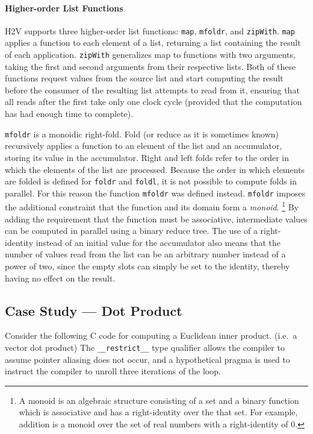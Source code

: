 \documentclass[english,onecolumn]{scrartcl}
\begin{document}
\paragraph{Higher-order List Functions}
\label{sec:listFuncs}
H2V supports three higher-order list functions: \texttt{map}, \texttt{mfoldr}, and \texttt{zipWith}.
\texttt{map} applies a function to each element of a list, returning a list containing the result of each application.
\texttt{zipWith} generalizes map to functions with two arguments, taking the first and second arguments from their respective
lists. Both of these functions request values from the source list and start computing the result before the consumer of the
resulting list attempts to read from it, ensuring that all reads after the first take only one clock cycle (provided that the
computation has had enough time to complete).

\texttt{mfoldr} is a monoidic right-fold. Fold (or reduce as it is sometimes known) recursively applies a function to an element
of the list and an accumulator, storing its value in the accumulator. Right and left folds refer to the order in which the
elements of the list are processed. Because the order in which elements are folded is defined for \texttt{foldr} and
\texttt{foldl}, it is not possible to compute folds in parallel. For this reason the function \texttt{mfoldr} was defined instead.
\texttt{mfoldr} imposes the additional constraint that the function and its domain form a \textit{monoid}.%
\footnote{A monoid is an algebraic structure consisting of a set and a binary function which is associative and has a
    right-identity over the that set. For example, addition is a monoid over the set of real numbers with a right-identity of 0.}
By adding the requirement that the function must be associative, intermediate values can be computed in parallel using a binary
reduce tree. The use of a right-identity instead of an initial value for the accumulator also means that the number of values read
from the list can be an arbitrary number instead of a power of two, since the empty slots can simply be set to the identity,
thereby having no effect on the result.



\subsection{Case Study --- Dot Product}
Consider the following C code for computing a Euclidean inner product. (i.e.\ a vector dot product)
The \texttt{\_\_restrict\_\_} type qualifier allows the compiler to assume pointer aliasing does not occur,\cite[122]{c_std}
and a hypothetical pragma is used to instruct the compiler to unroll three iterations of the loop.
\end{document}
